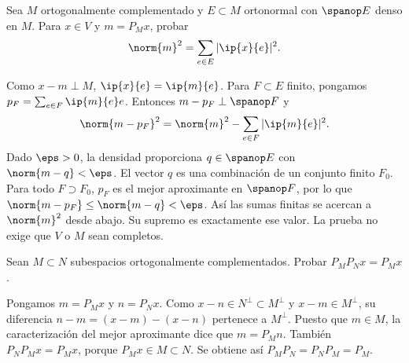 \begin{ejercicio}
Sea $M$ ortogonalmente complementado y $E\subset M$ ortonormal con $\spanop E$ denso en $M$. Para $x\in V$ y $m=P_Mx$, probar
\[
 \norm{m}^{2}=\sum_{e\in E}|\ip{x}{e}|^{2}.
\]
\end{ejercicio}
\begin{solucion}
Como $x-m\perp M$, $\ip{x}{e}=\ip{m}{e}$. Para $F\subset E$ finito, pongamos $p_F=\sum_{e\in F}\ip{m}{e}e$. Entonces $m-p_F\perp\spanop F$ y
\[
 \norm{m-p_F}^{2}=\norm{m}^{2}-\sum_{e\in F}|\ip{m}{e}|^{2}.
\]
Dado $\eps>0$, la densidad proporciona $q\in\spanop E$ con $\norm{m-q}<\eps$. El vector $q$ es una combinación de un conjunto finito $F_0$. Para todo $F\supset F_0$, $p_F$ es el mejor aproximante en $\spanop F$, por lo que $\norm{m-p_F}\leq\norm{m-q}<\eps$. Así las sumas finitas se acercan a $\norm{m}^{2}$ desde abajo. Su supremo es exactamente ese valor. La prueba no exige que $V$ o $M$ sean completos.
\end{solucion}

\begin{ejercicio}
Sean $M\subset N$ subespacios ortogonalmente complementados. Probar $P_MP_Nx=P_Mx$.
\end{ejercicio}
\begin{solucion}
Pongamos $m=P_Mx$ y $n=P_Nx$. Como $x-n\in N^{\perp}\subset M^{\perp}$ y $x-m\in M^{\perp}$, su diferencia $n-m=(x-m)-(x-n)$ pertenece a $M^{\perp}$. Puesto que $m\in M$, la caracterización del mejor aproximante dice que $m=P_Mn$. También $P_NP_Mx=P_Mx$, porque $P_Mx\in M\subset N$. Se obtiene así $P_MP_N=P_NP_M=P_M$.
\end{solucion}

